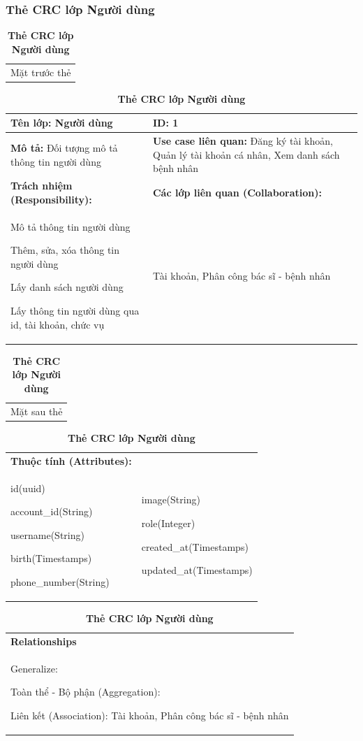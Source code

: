 \subsubsection{Thẻ CRC lớp Người dùng}
  \begin{table}[H]
    \caption{\bfseries \fontsize{12pt}{0pt}\selectfont Thẻ CRC lớp Người dùng}
    \centering
    \begin{tabularx}{0.9\textwidth}{X}
      Mặt trước thẻ
    \end{tabularx}
    \begin{tabularx}{0.9\textwidth}{|X|X|}
      \hline
      \textbf{Tên lớp:} Người dùng & \textbf{ID:} 1 \\
      \hline
      \textbf{Mô tả:} Đối tượng mô tả thông tin người dùng & \textbf{Use case liên quan:}  Đăng ký tài khoản, Quản lý tài khoản cá nhân, Xem danh sách bệnh nhân\\
      \hline
      \textbf{Trách nhiệm (Responsibility):} & \textbf{Các lớp liên quan (Collaboration):} \\
      Mô tả thông tin người dùng

      Thêm, sửa, xóa thông tin người dùng 

      Lấy danh sách người dùng

      Lấy thông tin người dùng qua id, tài khoản, chức vụ
      & 
      Tài khoản, Phân công bác sĩ - bệnh nhân
      \\
      \hline
    \end{tabularx}
    \begin{tabularx}{0.9\textwidth}{X}
      Mặt sau thẻ
    \end{tabularx}
    \begin{tabularx}{0.9\textwidth}{|X|X|}
      \hline
      \textbf{Thuộc tính (Attributes):} & \\
      id(uuid) 
      
      account\_id(String)

      username(String)

      birth(Timestamps)

      phone\_number(String)
      & 
      image(String) 
      
      role(Integer) 
      
      created\_at(Timestamps)

      updated\_at(Timestamps)
      \\
      \hline
    \end{tabularx}
    \begin{tabularx}{0.9\textwidth}{|X|}
      \textbf{Relationships} \\
      Generalize:  

      Toàn thể - Bộ phận (Aggregation):
      
      Liên kết (Association): Tài khoản, Phân công bác sĩ - bệnh nhân 
      \\
      \hline
    \end{tabularx}
  \end{table}

